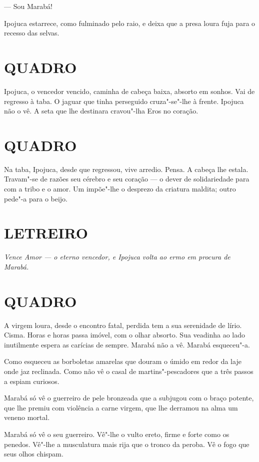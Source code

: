 --- Sou Marabá!

Ipojuca estarrece, como fulminado pelo raio, e deixa que a presa loura
fuja para o recesso das selvas.

\section*{QUADRO}

Ipojuca, o vencedor vencido, caminha de cabeça baixa, absorto em sonhos.
Vai de regresso à taba. O jaguar que tinha perseguido cruza"-se"-lhe à
frente. Ipojuca não o vê. A seta que lhe destinara cravou"-lha Eros no
coração.

\section*{QUADRO}

Na taba, Ipojuca, desde que regressou, vive arredio. Pensa. A cabeça lhe
estala. Travam"-se de razões seu cérebro e seu coração --- o dever de
solidariedade para com a tribo e o amor. Um impõe"-lhe o desprezo da
criatura maldita; outro pede"-a para o beijo.

\section*{LETREIRO}

\emph{Vence Amor --- o eterno vencedor, e Ipojuca volta ao ermo em
procura de Marabá.}

\section*{QUADRO}

A virgem loura, desde o encontro fatal, perdida tem a sua serenidade de
lírio. Cisma. Horas e horas passa imóvel, com o olhar absorto. Sua
veadinha ao lado inutilmente espera as carícias de sempre. Marabá não a
vê. Marabá esqueceu"-a.

Como esqueceu as borboletas amarelas que douram o úmido em redor da laje
onde jaz reclinada. Como não vê o casal de martins"-pescadores que a três
passos a espiam curiosos.

Marabá só vê o guerreiro de pele bronzeada que a subjugou com o braço
potente, que lhe premiu com violência a carne virgem, que lhe derramou
na alma um veneno mortal.

Marabá só vê o seu guerreiro. Vê"-lhe o vulto ereto, firme e forte como
os penedos. Vê"-lhe a musculatura mais rija que o tronco da peroba. Vê o
fogo que seus olhos chispam.

